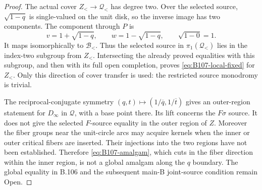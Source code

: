 \begin{proof}
The actual cover $Z_<\to\mathscr Q_<$ has degree two. Over the
selected source, $\sqrt{1-q}$ is single-valued on the unit disk,
so the inverse image has two components. The component through
$P$ is
\[
 v=1+\sqrt{1-q},\qquad w=1-\sqrt{1-q},
 \qquad \sqrt{1-0}=1.
\]
It maps isomorphically to $\mathscr B_<$. Thus the selected
source in $\pi_1(\mathscr Q_<)$ lies in the index-two subgroup
from $Z_<$. Intersecting the already proved equalities with this
subgroup, and then with its full open completion, proves
\eqref{eq:B107-local-fixed} for $Z_<$. Only this direction of
cover transfer is used: the restricted source monodromy is trivial.

The reciprocal-conjugate symmetry
$(q,t)\mapsto(1/\overline q,1/\overline t)$ gives an outer-region
statement for $D_\infty$ in $\mathscr Q$, with a base point there.
Its lift concerns the $F\sigma$ source. It does not give the
selected $F$-source equality in the outer region of $Z$.
Moreover the fiber groups near the unit-circle arcs may acquire
kernels when the inner or outer critical fibers are inserted.
Their injections into the two regions have not been established.
Therefore \eqref{eq:B107-amalgam}, which cuts in the fiber
direction within the inner region, is not a global amalgam along
the $q$ boundary. The global equality in B.106 and the subsequent
main-B joint-source condition remain Open.
\end{proof}
